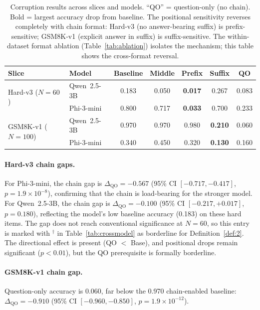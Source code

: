 \documentclass{article}
\theoremstyle{definition}
\theoremstyle{definition}
\begin{document}
\begin{table}[!t]
  \centering
  \small
  \caption{Corruption results across slices and models. ``QO'' = question-only
  (no chain). Bold = largest accuracy drop from baseline.
  The positional sensitivity reverses completely with chain format:
  Hard-v3 (no answer-bearing suffix) is prefix-sensitive;
  GSM8K-v1 (explicit answer in suffix) is suffix-sensitive.
  The within-dataset format ablation (Table~\ref{tab:ablation}) isolates the
  mechanism; this table shows the cross-format reversal.}
  \label{tab:main-results}
  \begin{tabular}{llccccc}
    \toprule
    Slice & Model & Baseline & Middle & Prefix & Suffix & QO \\
    \midrule
    \multirow{2}{*}{Hard-v3 ($N{=}60$)}
      & Qwen~2.5-3B  & 0.183 & 0.050 & \textbf{0.017} & 0.267 & 0.083 \\
      & Phi-3-mini    & 0.800 & 0.717 & \textbf{0.033} & 0.700 & 0.233 \\
    \midrule
    \multirow{2}{*}{GSM8K-v1 ($N{=}100$)}
      & Qwen~2.5-3B  & 0.970 & 0.970 & 0.980 & \textbf{0.210} & 0.060 \\
      & Phi-3-mini    & 0.340 & 0.450 & 0.320 & \textbf{0.130} & 0.160 \\
    \bottomrule
  \end{tabular}
\end{table}

\paragraph{Hard-v3 chain gaps.}
For Phi-3-mini, the chain gap is $\Delta_\mathrm{QO} = -0.567$
(95\% CI $[-0.717, -0.417]$, $p = 1.9 \times 10^{-8}$),
confirming that the chain is load-bearing for the stronger model.
For Qwen~2.5-3B, the chain gap is $\Delta_\mathrm{QO} = -0.100$
(95\% CI $[-0.217, +0.017]$, $p = 0.180$),
reflecting the model's low baseline accuracy (0.183) on these hard items.
The gap does not reach conventional significance at $N{=}60$, so this
entry is marked with $^\dagger$ in Table~\ref{tab:crossmodel} as
borderline for Definition~\ref{def:2}. The directional effect is
present (QO $<$ Base), and positional drops remain significant
($p{<}0.01$), but the QO prerequisite is formally borderline.

\paragraph{GSM8K-v1 chain gap.}
Question-only accuracy is 0.060, far below the 0.970 chain-enabled baseline:
$\Delta_\mathrm{QO} = -0.910$
(95\% CI $[-0.960, -0.850]$, $p = 1.9 \times 10^{-12}$).
\end{document}
